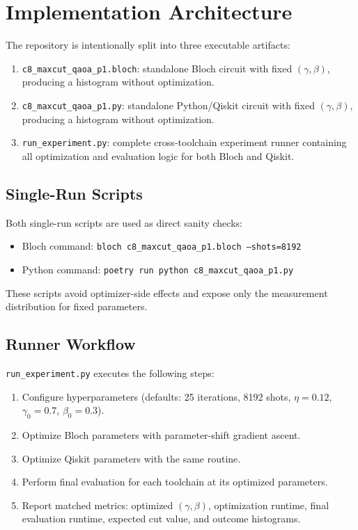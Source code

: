 \section{Implementation Architecture}
\label{sec:implementation_architecture}

The repository is intentionally split into three executable artifacts:
\begin{enumerate}
    \item \texttt{c8\_maxcut\_qaoa\_p1.bloch}: standalone Bloch circuit with fixed \((\gamma,\beta)\), producing a histogram without optimization.
    \item \texttt{c8\_maxcut\_qaoa\_p1.py}: standalone Python/Qiskit circuit with fixed \((\gamma,\beta)\), producing a histogram without optimization.
    \item \texttt{run\_experiment.py}: complete cross-toolchain experiment runner containing
    all optimization and evaluation logic for both Bloch and Qiskit.
\end{enumerate}

\subsection{Single-Run Scripts}

Both single-run scripts are used as direct sanity checks:
\begin{itemize}
    \item Bloch command: \texttt{bloch c8\_maxcut\_qaoa\_p1.bloch --shots=8192}
    \item Python command: \texttt{poetry run python c8\_maxcut\_qaoa\_p1.py}
\end{itemize}
These scripts avoid optimizer-side effects and expose only the measurement distribution for fixed parameters.

\subsection{Runner Workflow}

\texttt{run\_experiment.py} executes the following steps:
\begin{enumerate}
    \item Configure hyperparameters (defaults: 25 iterations, 8192 shots, \(\eta=0.12\), \(\gamma_0=0.7\), \(\beta_0=0.3\)).
    \item Optimize Bloch parameters with parameter-shift gradient ascent.
    \item Optimize Qiskit parameters with the same routine.
    \item Perform final evaluation for each toolchain at its optimized parameters.
    \item Report matched metrics:
    optimized \((\gamma,\beta)\), optimization runtime, final evaluation runtime, expected cut value, and outcome histograms.
\end{enumerate}

